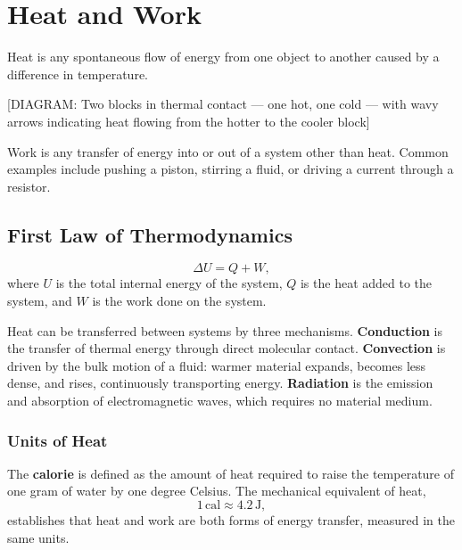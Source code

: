 \chapter{Heat and Work}

\begin{definition}[Heat]
Heat is any spontaneous flow of energy from one object to another caused by a difference in temperature.
\end{definition}

\begin{center}[DIAGRAM: Two blocks in thermal contact --- one hot, one cold --- with wavy arrows indicating heat flowing from the hotter to the cooler block]\end{center}

\begin{definition}[Work]
Work is any transfer of energy into or out of a system other than heat. Common examples include pushing a piston, stirring a fluid, or driving a current through a resistor.
\end{definition}

\section{First Law of Thermodynamics}

\begin{theorem}
\[
    \Delta U = Q + W,
\]
where $U$ is the total internal energy of the system, $Q$ is the heat added to the system, and $W$ is the work done on the system.
\end{theorem}

Heat can be transferred between systems by three mechanisms. \textbf{Conduction} is the transfer of thermal energy through direct molecular contact. \textbf{Convection} is driven by the bulk motion of a fluid: warmer material expands, becomes less dense, and rises, continuously transporting energy. \textbf{Radiation} is the emission and absorption of electromagnetic waves, which requires no material medium.

\subsection{Units of Heat}

The \textbf{calorie} is defined as the amount of heat required to raise the temperature of one gram of water by one degree Celsius. The mechanical equivalent of heat,
\[
    1\,\text{cal} \approx 4.2\,\text{J},
\]
establishes that heat and work are both forms of energy transfer, measured in the same units.

